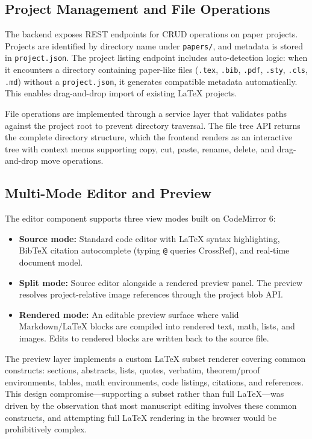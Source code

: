 \documentclass[11pt,a4paper]{article}
\begin{document}
\subsection{Project Management and File Operations}

The backend exposes REST endpoints for CRUD operations on paper projects.
Projects are identified by directory name under \texttt{papers/}, and metadata
is stored in \texttt{project.json}. The project listing endpoint includes
auto-detection logic: when it encounters a directory containing paper-like
files (\texttt{.tex}, \texttt{.bib}, \texttt{.pdf}, \texttt{.sty}, \texttt{.cls},
\texttt{.md}) without a \texttt{project.json}, it generates compatible metadata
automatically. This enables drag-and-drop import of existing \LaTeX{} projects.

File operations are implemented through a service layer that validates paths
against the project root to prevent directory traversal. The file tree API
returns the complete directory structure, which the frontend renders as an
interactive tree with context menus supporting copy, cut, paste, rename,
delete, and drag-and-drop move operations.

\subsection{Multi-Mode Editor and Preview}

The editor component supports three view modes built on CodeMirror 6:

\begin{itemize}
  \item \textbf{Source mode:} Standard code editor with \LaTeX{} syntax
  highlighting, BibTeX citation autocomplete (typing \texttt{@} queries
  CrossRef), and real-time document model.

  \item \textbf{Split mode:} Source editor alongside a rendered preview panel.
  The preview resolves project-relative image references through the project
  blob API.

  \item \textbf{Rendered mode:} An editable preview surface where valid
  Markdown/\LaTeX{} blocks are compiled into rendered text, math, lists, and
  images. Edits to rendered blocks are written back to the source file.
\end{itemize}

The preview layer implements a custom \LaTeX{} subset renderer covering common
constructs: sections, abstracts, lists, quotes, verbatim, theorem/proof
environments, tables, math environments, code listings, citations, and
references. This design compromise---supporting a subset rather than full
\LaTeX{}---was driven by the observation that most manuscript editing involves
these common constructs, and attempting full \LaTeX{} rendering in the browser
would be prohibitively complex.
\end{document}
